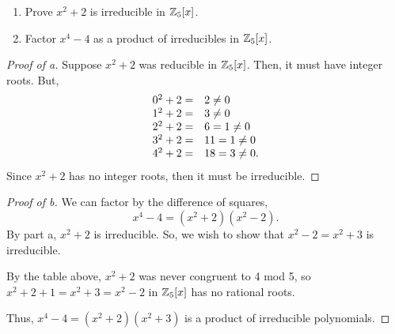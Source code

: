 \documentclass[../hw5]{subfiles}
\begin{document}
\begin{problem}
\begin{enumerate}[label=\alph*)]
	\item Prove $x^2 + 2$ is irreducible in $\mathbb{Z}_5[x]$.
	\item Factor $x^4-4$ as a product of irreducibles in  $\mathbb{Z}_5[x]$.
\end{enumerate}
\end{problem}
\begin{proof}[Proof of a]
	Suppose $x^2 + 2$ was reducible in $\mathbb{Z}_5[x]$.
	Then, it must have integer roots.
	But, \[
		\begin{array}{r l}
			0^2 + 2 =  & 2 \neq 0        \\
			1^2  + 2 = & 3 \neq  0       \\
			2^2+2 =    & 6 = 1 \neq  0   \\
			3^2+2 =    & 11 = 1 \neq 0   \\
			4^2+2 =    & 18 = 3 \neq  0. \\
		\end{array}\]
	Since $x^2+2$ has no integer roots, then it must be irreducible.
\end{proof}
\begin{proof}[Proof of b]
	We can factor by the difference of squares, \[
		x^4-4 = (x^2+2)(x^2-2)
		.\]
	By part a, $x^2+2$ is irreducible.
	So, we wish to show that $x^2-2 = x^2+3$ is irreducible.

	By the table above, $x^2 + 2$ was never congruent to 4 mod 5, so $x^2 + 2 + 1=x^2+3=x^2-2$ in $\mathbb{Z}_5[x]$ has no rational roots.

	Thus, $x^4-4=(x^2+2)(x^2+3)$ is a product of irreducible polynomials.
\end{proof}
\end{document}
